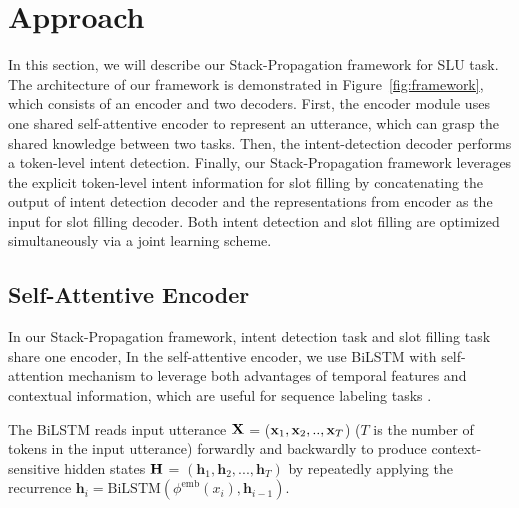 \documentclass[11pt,a4paper]{article}
\begin{document}
\section{Approach}
In this section, we will describe our Stack-Propagation framework for SLU task.
The architecture of our framework is demonstrated in Figure~\ref{fig:framework}, 
which consists of an encoder and two decoders. 
First, the encoder module uses one shared self-attentive encoder to represent an utterance, which can grasp the shared knowledge between two tasks.
Then, the intent-detection decoder performs a token-level intent detection.
Finally, our Stack-Propagation framework leverages the explicit token-level intent information for slot filling 
by concatenating the output of intent detection decoder and the representations from encoder as the input for slot filling decoder. 
Both intent detection and slot filling are optimized simultaneously via a joint learning scheme.


\subsection{Self-Attentive Encoder}
In our Stack-Propagation framework, intent detection task and slot filling task share one encoder, 
In the self-attentive encoder, 
we use BiLSTM with self-attention mechanism to 
leverage both advantages of temporal features and contextual information, which 
are useful 
for sequence labeling tasks \cite{P18-1135,yin2018deep}.

The BiLSTM  \cite{hochreiter1997long} reads input utterance $\bf{X}$ = (${\bf{x}}_{1}, {\bf{x}}_{2},.., {\bf{x}}_{T}$)  ($T$ is the 
number of tokens in the input utterance)  forwardly and backwardly to produce context-sensitive  hidden states $\bf{H}$ =  $(\mathbf{h}_{1}, \mathbf{h}_2, ..., \mathbf{h}_{T})$
by repeatedly applying the recurrence 
$\mathbf{h}_{i}=\text{BiLSTM}\left( \phi ^{\text{emb}}\left( x_{i}\right) , \mathbf{h}_{i-1}\right)$.
\end{document}
